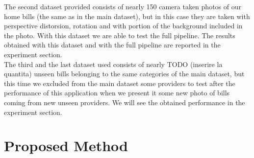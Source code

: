 \documentclass[10pt,twocolumn,letterpaper]{article}
\begin{document}
The second dataset provided consists of nearly 150 camera taken photos of our home bills (the same as in the main dataset), but in this case they are taken with perspective distorsion, rotation and with portion of the background included in the photo. With this dataset we are able to test the full pipeline. The results obtained with this dataset and with the full pipeline are reported in the experiment section. \\

The third and the last dataset used consists of nearly TODO (inserire la quantita) unseen bills belonging to the same categories of the main dataset, but this time we excluded from the main dataset some providers to test after the performance of this application when we present it some new photo of bills coming from new unseen providers. We will see the obtained performance in the experiment section.

\section{Proposed Method}
\label{sec:proposed-method}
\end{document}
